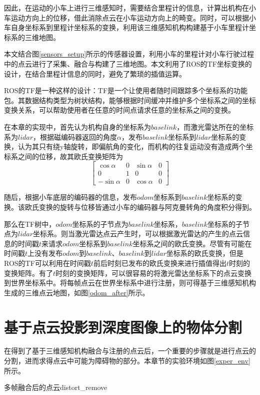 因此，在运动的小车上进行三维感知时，需要结合里程计的信息，计算出机构在小车运动方向上的位移，借此消除点云在小车运动方向上的畸变。同时，可以根据小车自身坐标系到里程计坐标系的变换，利用该三维感知机构构建基于小车里程计坐标系的三维地图。

本文结合图\ref{sensors_setup}所示的传感器设置，利用小车的里程计对小车行驶过程中的点云进行了采集、融合与构建了三维地图。本文利用了ROS的TF坐标变换的设计，在结合里程计信息的同时，避免了繁琐的插值运算。

ROS的TF是一种这样的设计：TF是一个让使用者随时间跟踪多个坐标系的功能包。其数据结构类型为树状结构，能够根据时间缓冲并维护多个坐标系之间的坐标变换关系，可以帮助使用者在任意的时间点请求任意的坐标系之间的变换。

在本章的实现中，首先认为机构自身的坐标系为$baselink$，而激光雷达所在的坐标系为$lidar$，根据磁编码器返回的角度$\alpha$，发布$baselink$坐标系到$lidar$坐标系的变换，认为其只有绕y轴旋转，即偏航角的变化，而机构的往复运动没有造成两个坐标系之间的位移，故其欧氏变换矩阵为
$$
\begin{bmatrix}
    \cos \alpha & 0 & \sin \alpha & 0\\
    0 & 1& 0 & 0\\
    -\sin \alpha & 0 & \cos \alpha & 0 
\end{bmatrix}
$$

随后，根据小车底层的编码器的信息，发布$odom$坐标系到$baselink$坐标系的变换。该欧氏变换的旋转与位移皆通过小车的编码器与阿克曼转角的角度积分得到。


那么在TF树中，$odom$坐标系的子节点为$baselink$坐标系，$baselink$坐标系的子节点为$lidar$坐标系。则当激光雷达点云产生时，可以根据激光雷达的产生的点云信息的时间戳$t$来请求$odom$坐标系到$baselink$坐标系之间的欧氏变换。尽管有可能在时间戳$t$上没有发布$odom$到$baselink$、$baselink$到$lidar$坐标系的欧氏变换，但是ROS的TF可以利用在时间戳$t$前后时刻已发布的欧氏变换来进行插值得出$t$时刻的变换矩阵。有了$t$时刻的变换矩阵，可以很容易的将激光雷达坐标系下的点云变换到世界坐标系中。将每帧点云在世界坐标系中进行注册，则可得基于三维感知机构生成的三维点云地图，如图\ref{odom_after}所示。

\section{基于点云投影到深度图像上的物体分割}

在得到了基于三维感知机构融合与注册的点云后，一个重要的步骤就是进行点云的分割，进而求得点云中可能为障碍物的部分。本章节的实验环境如图\ref{exper_env}所示。
\begin{pics}[htbp]{多帧融合后的点云}{distort_remove}
\end{pics}

